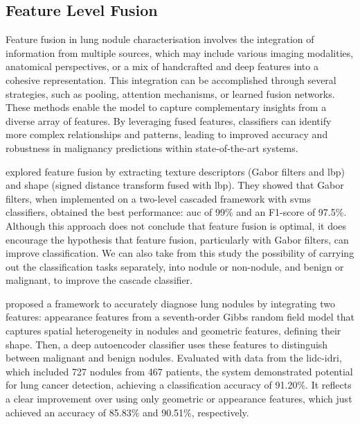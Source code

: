 \subsection{Feature Level Fusion}
Feature fusion in lung nodule characterisation involves the integration of information from multiple sources, which may include various imaging modalities, anatomical perspectives, or a mix of handcrafted and deep features into a cohesive representation. This integration can be accomplished through several strategies, such as pooling, attention mechanisms, or learned fusion networks. These methods enable the model to capture complementary insights from a diverse array of features. By leveraging fused features, classifiers can identify more complex relationships and patterns, leading to improved accuracy and robustness in malignancy predictions within state-of-the-art systems. 

\textcite{farag_feature_2017} explored feature fusion by extracting texture descriptors (Gabor filters and \ac{lbp}) and shape (signed distance transform fused with \ac{lbp}). They showed that Gabor filters, when implemented on a two-level cascaded framework with \acp{svm} classifiers, obtained the best performance: \ac{auc} of 99\% and an F1-score of 97.5\%. Although this approach does not conclude that feature fusion is optimal, it does encourage the hypothesis that feature fusion, particularly with Gabor filters, can improve classification. We can also take from this study the possibility of carrying out the classification tasks separately, into nodule or non-nodule, and benign or malignant, to improve the cascade classifier.

\textcite{shaffie_generalized_2018} proposed a framework to accurately diagnose lung nodules by integrating two features: appearance features from a seventh-order Gibbs random field model that captures spatial heterogeneity in nodules and geometric features, defining their shape. Then, a deep autoencoder classifier uses these features to distinguish between malignant and benign nodules. Evaluated with data from the \ac{lidc-idri}, which included 727 nodules from 467 patients, the system demonstrated potential for lung cancer detection, achieving a classification accuracy of 91.20\%. It reflects a clear improvement over using only geometric or appearance features, which just achieved an accuracy of 85.83\% and 90.51\%, respectively.

